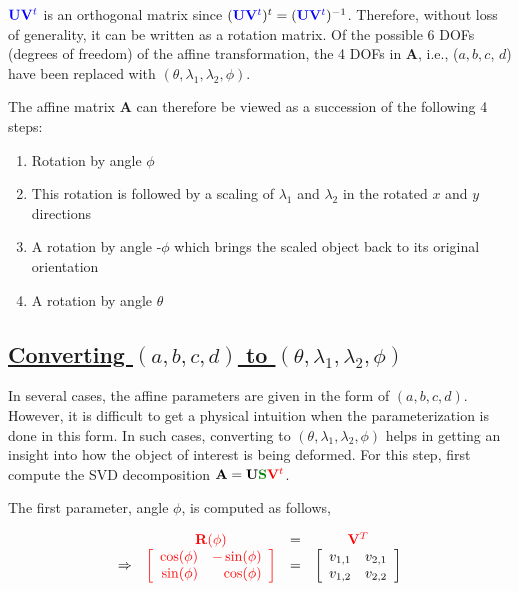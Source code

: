 ${\color{blue}\mathbf{U}\mathbf{V}^t}$ is an orthogonal matrix since $({\color{blue}\mathbf{U}\mathbf{V}^t})^t =({\color{blue}\mathbf{U}\mathbf{V}^t})^{-1}$.  Therefore, without loss of generality, it can be written as a rotation matrix.  Of the possible 6 DOFs (degrees of freedom) of the affine transformation, the 4 DOFs in $\mathbf{A}$, i.e., ($a, b, c$, $d$) have been replaced with $(\theta, \lambda_1, \lambda_2, \phi)$.

The affine matrix $\mathbf{A}$ can therefore be viewed as a succession of the following 4 steps:

\begin{enumerate} 
\item Rotation by angle $\phi$ 
\item This rotation is followed by a scaling of $\lambda_1$ and $\lambda_2$ in the rotated $x$ and $y$ directions
\item A rotation by angle -$\phi$ which brings the scaled object back to its original orientation
\item A rotation by angle $\theta$
\end{enumerate}

\subsection{\underline{Converting $(a, b, c, d)$ to $(\theta, \lambda_1, \lambda_2, \phi)$}}
\label{sec:abcd_to_tllp}
In several cases, the affine parameters are given in the form of $(a, b, c, d)$.  However, it is difficult to get a physical intuition when the parameterization is done in this form.  In such cases, converting to $(\theta, \lambda_1, \lambda_2, \phi)$ helps in getting an insight into how the object of interest is being deformed.  For this step, first compute the SVD decomposition $\mathbf{A}=\mathbf{U}{\color{darkgreen}\mathbf{S}}{\color{red}\mathbf{V}^t}$.  

The first parameter, angle $\phi$, is computed as follows,

\begin{equation}
\begin{array}{ccccll}
&{\color{red}\mathbf{R}(\phi)}&=&{\color{red}\mathbf{V}^T}\\
\Rightarrow &{\color{red}\left[ \begin{array}{rr} \cos(\phi) & -\sin(\phi) \\ \sin(\phi) & \cos(\phi) \\ \end{array} \right]} &=& \left[\begin{array}{llll}v_{1,1} &v_{2,1}\\v_{1,2} & v_{2,2}\end{array}\right]\\
\end{array}
\end{equation}

